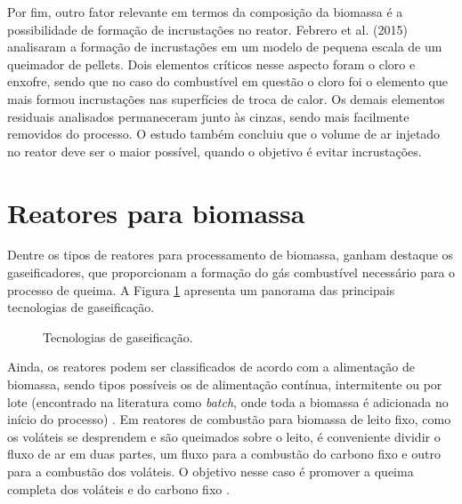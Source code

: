 Por fim, outro fator relevante em termos da composição da biomassa é a possibilidade de formação de incrustações no reator. Febrero et al. (2015) analisaram a formação de incrustações em um modelo de pequena escala de um queimador de pellets. Dois elementos críticos nesse aspecto foram o cloro e enxofre, sendo que no caso do combustível em questão o cloro foi o elemento que mais formou incrustações nas superfícies de troca de calor. Os demais elementos residuais analisados permaneceram junto às cinzas, sendo mais facilmente removidos do processo. O estudo também concluiu que o volume de ar injetado no reator deve ser o maior possível, quando o objetivo é evitar incrustações.

\section{Reatores para biomassa}
Dentre os tipos de reatores para processamento de biomassa, ganham destaque os gaseificadores, que proporcionam a formação do gás combustível necessário para o processo de queima. A Figura \ref{fig:gasification_technologies} apresenta um panorama das principais tecnologias de gaseificação.

\begin{figure}[!ht]
	\centering
	\caption{Tecnologias de gaseificação.}
	\label{fig:gasification_technologies}
\end{figure}

Ainda, os reatores podem ser classificados de acordo com a alimentação de biomassa, sendo tipos possíveis os de alimentação contínua, intermitente ou por lote (encontrado na literatura como \textit{batch}, onde toda a biomassa é adicionada no início do processo) \cite{Kruger}. Em reatores de combustão para biomassa de leito fixo, como os voláteis se desprendem e são queimados sobre o leito, é conveniente dividir o fluxo de ar em duas partes, um fluxo para a combustão do carbono fixo e outro para a combustão dos voláteis. O objetivo nesse caso é promover a queima completa dos voláteis e do carbono fixo \cite{Brand}.

